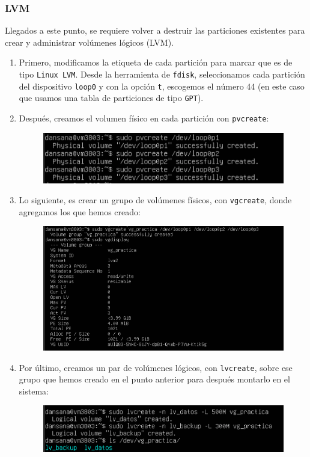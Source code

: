 \documentclass[10pt]{article}
\begin{document}
	\subsubsection{LVM}
	Llegados a este punto, se requiere volver a destruir las particiones existentes para crear y administrar volúmenes lógicos (LVM).
	\begin{enumerate}
		\item Primero, modificamos la etiqueta de cada partición para marcar que es de tipo \verb|Linux LVM|. Desde la herramienta de \verb|fdisk|, seleccionamos cada partición del dispositivo \verb|loop0| y con la opción \verb|t|, escogemos el número 44 (en este caso que usamos una tabla de particiones de tipo \verb|GPT|).
		\item Después, creamos el volumen físico en cada partición con \verb|pvcreate|:
		\begin{figure}[H]
			\setlength{\abovecaptionskip}{0cm}
			\setlength{\belowcaptionskip}{0cm}
			\centering
			\includegraphics[width=0.6\linewidth]{Recursos/pvcreate.png}
		\end{figure}
		\item Lo siguiente, es crear un grupo de volúmenes físicos, con \verb|vgcreate|, donde agregamos los que hemos creado:
		\begin{figure}[H]
			\setlength{\abovecaptionskip}{0cm}
			\setlength{\belowcaptionskip}{0cm}
			\centering
			\includegraphics[width=0.6\linewidth]{Recursos/vgcreate.png}
		\end{figure}
		\clearpage
		\item Por último, creamos un par de volúmenes lógicos, con \verb|lvcreate|, sobre ese grupo que hemos creado en el punto anterior para después montarlo en el sistema:
		\begin{figure}[H]
			\setlength{\abovecaptionskip}{0cm}
			\setlength{\belowcaptionskip}{0cm}
			\centering
			\includegraphics[width=0.6\linewidth]{Recursos/lvcreate.png}

\end{figure}
\end{enumerate}
\end{document}

